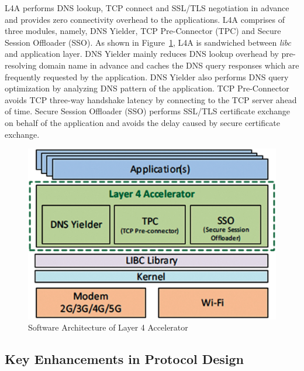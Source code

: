 \begin{multicols}{2}
L4A performs DNS lookup, TCP connect and SSL/TLS negotiation in advance and provides zero connectivity overhead to the applications. L4A comprises of three modules, namely, DNS Yielder, TCP Pre-Connector (TPC) and Secure Session Offloader (SSO). As shown in Figure~\ref{chap1-fig07}, L4A is sandwiched between \textit{libc} and application layer. DNS Yielder mainly reduces DNS lookup overhead by pre-resolving domain name in advance and caches the DNS query responses which are frequently requested by the application. DNS Yielder also performs DNS query optimization by analyzing DNS pattern of the application. TCP Pre-Connector avoids TCP three-way handshake latency by connecting to the TCP server ahead of time. Secure Session Offloader (SSO) performs SSL/TLS certificate exchange on behalf of the application and avoids the delay caused by secure certificate exchange.

\begin{figure}[H]
\centering
\includegraphics[scale=.9]{src/Figures/chap1/chap1-fig07.jpg}
\caption{Software Architecture of Layer 4 Accelerator}\label{chap1-fig07}
\vspace{-.4cm}
\end{figure}

\subsection{Key Enhancements in Protocol Design}


\end{multicols}
